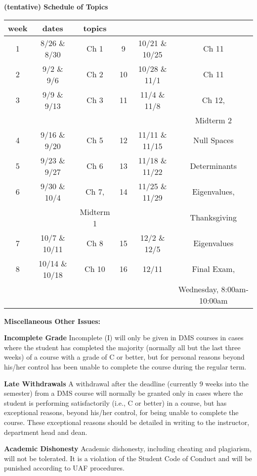 \documentclass[12pt]{article}
\begin{document}
\begin{center}
\textbf{(tentative) Schedule of Topics}\\

\begin{tabular}{c | c | c || c | c | c}
week & dates &topics \\
\hline \hline
1& 8/26 \& 8/30 &Ch 1 &9& 10/21 \& 10/25 &Ch 11 \\ \hline
2& 9/2 \& 9/6& Ch 2 & 10& 10/28 \& 11/1& Ch 11\\ \hline
3& 9/9 \& 9/13 & Ch 3 & 11& 11/4 \& 11/8& Ch 12, \\
&&&&&Midterm 2\\ \hline
4& 9/16 \& 9/20 & Ch 5 & 12& 11/11 \& 11/15& Null Spaces\\ \hline
5& 9/23 \& 9/27& Ch 6 & 13& 11/18 \& 11/22& Determinants \\ \hline
6& 9/30 \& 10/4& Ch 7, &14& 11/25 \& 11/29&Eigenvalues, \\
&&Midterm 1 &&&Thanksgiving\\ \hline
7& 10/7 \& 10/11& Ch 8 & 15& 12/2 \& 12/5&Eigenvalues\\ \hline
8& 10/14 \& 10/18& Ch 10 & 16& 12/11& Final Exam, \\
&&&&&Wednesday, 8:00am-10:00am\\ \hline
\end{tabular}
\end{center}

\newpage


\textbf{Miscellaneous Other Issues:}

\textbf{Incomplete Grade} 
Incomplete (I) will only be given in DMS courses in cases where the student has completed the majority (normally all but the last three weeks) of a course with a grade of C or better, but for personal reasons beyond his/her control has been unable to complete the course during the regular term. 

\textbf{Late Withdrawals} 
A withdrawal after the deadline (currently 9 weeks into the semester) from a DMS course will normally be granted only in cases where the student is performing satisfactorily (i.e., C or better) in a course, but has exceptional reasons, beyond his/her control, for being unable to complete the course. These exceptional reasons should be detailed in writing to the instructor, department head and dean.

\textbf{Academic Dishonesty}
Academic dishonesty, including cheating and plagiarism, will not
be tolerated.  It is a violation of the Student Code of Conduct
and will be punished according to UAF procedures.
\end{document}
